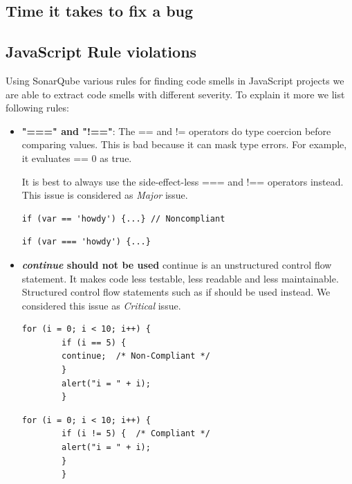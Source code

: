 \subsection{Time it takes to fix a bug}
\subsection{JavaScript Rule violations}
Using SonarQube various rules for finding code smells in JavaScript projects we are able to extract code smells with different severity. To explain it more we list following rules:

\begin{itemize}
	\item \textbf{"===" and "!=="}:
The == and != operators do type coercion before comparing values. This is bad because it can mask type errors. For example, it evaluates    == 0 as true.

It is best to always use the side-effect-less === and !== operators instead. This issue is considered as \textit{Major} issue.

		\begin{lstlisting}[caption=Noncompliant Code Example]
		if (var == 'howdy') {...} // Noncompliant
		\end{lstlisting}
		
		\begin{lstlisting}[caption=Compliant Solution]
		if (var === 'howdy') {...}
		\end{lstlisting}


	\item \textbf{\textit{continue} should not be used}
	continue is an unstructured control flow statement. It makes code less testable, less readable and less maintainable. Structured control flow statements such as if should be used instead. We considered this issue as \textit{Critical} issue.
	
		
		\begin{lstlisting}[caption=Noncompliant Code Example]
		for (i = 0; i < 10; i++) {
		if (i == 5) {
		continue;  /* Non-Compliant */
		}
		alert("i = " + i);
		}
		\end{lstlisting}
		
		\begin{lstlisting}[caption=Compliant Solution]
		for (i = 0; i < 10; i++) {
		if (i != 5) {  /* Compliant */
		alert("i = " + i);
		}
		}
		\end{lstlisting}
	
	
	

\end{itemize}
